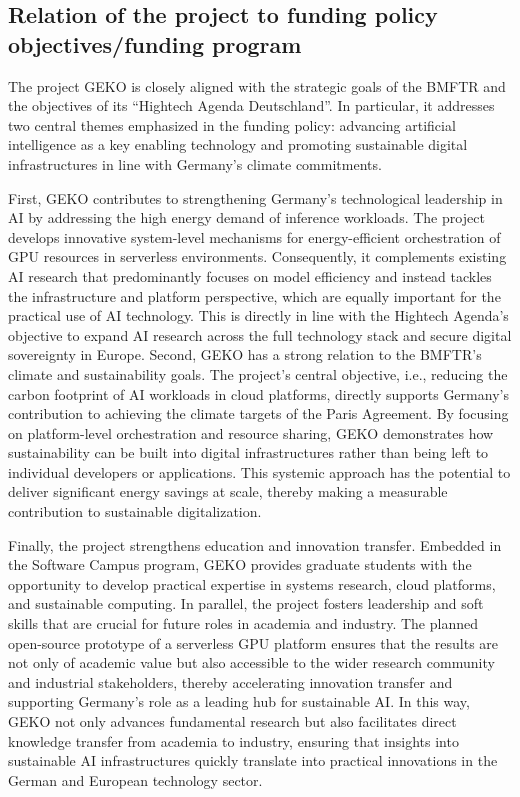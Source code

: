 \subsection{Relation of the project to funding policy objectives/funding program}


The project GEKO is closely aligned with the strategic goals of the BMFTR and the objectives of its \enquote{Hightech Agenda Deutschland}.
In particular, it addresses two central themes emphasized in the funding policy: advancing artificial intelligence as a key enabling technology and promoting sustainable digital infrastructures in line with Germany's climate commitments.

First, GEKO contributes to strengthening Germany's technological leadership in AI by addressing the high energy demand of inference workloads.
The project develops innovative system-level mechanisms for energy-efficient orchestration of GPU resources in serverless environments.
Consequently, it complements existing AI research that predominantly focuses on model efficiency and instead tackles the infrastructure and platform perspective, which are equally important for the practical use of AI technology.
This is directly in line with the Hightech Agenda's objective to expand AI research across the full technology stack and secure digital sovereignty in Europe.
Second, GEKO has a strong relation to the BMFTR's climate and sustainability goals.
The project's central objective, i.e., reducing the carbon footprint of AI workloads in cloud platforms, directly supports Germany's contribution to achieving the climate targets of the Paris Agreement.
By focusing on platform-level orchestration and resource sharing, GEKO demonstrates how sustainability can be built into digital infrastructures rather than being left to individual developers or applications.
This systemic approach has the potential to deliver significant energy savings at scale, thereby making a measurable contribution to sustainable digitalization.

Finally, the project strengthens education and innovation transfer.
Embedded in the Software Campus program, GEKO provides graduate students with the opportunity to develop practical expertise in systems research, cloud platforms, and sustainable computing.
In parallel, the project fosters leadership and soft skills that are crucial for future roles in academia and industry.
The planned open-source prototype of a serverless GPU platform ensures that the results are not only of academic value but also accessible to the wider research community and industrial stakeholders, thereby accelerating innovation transfer and supporting Germany's role as a leading hub for sustainable AI.
In this way, GEKO not only advances fundamental research but also facilitates direct knowledge transfer from academia to industry, ensuring that insights into sustainable AI infrastructures quickly translate into practical innovations in the German and European technology sector.